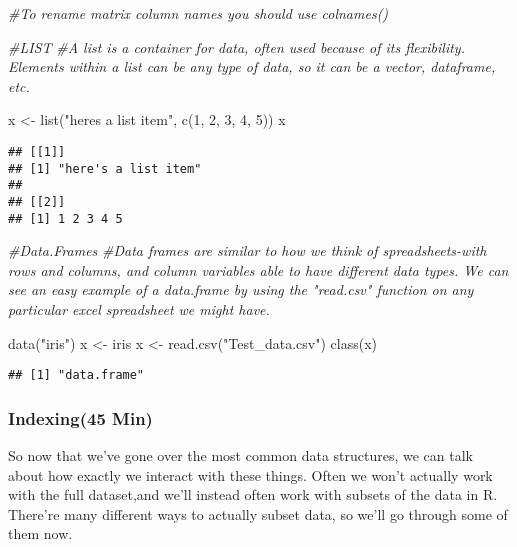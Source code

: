 \documentclass[
]{article}
\newenvironment{Shaded}{\begin{snugshade}}{\end{snugshade}}
\newcommand{\CommentTok}[1]{\textcolor[rgb]{0.56,0.35,0.01}{\textit{#1}}}
\newcommand{\DecValTok}[1]{\textcolor[rgb]{0.00,0.00,0.81}{#1}}
\newcommand{\FunctionTok}[1]{\textcolor[rgb]{0.00,0.00,0.00}{#1}}
\newcommand{\NormalTok}[1]{#1}
\newcommand{\OtherTok}[1]{\textcolor[rgb]{0.56,0.35,0.01}{#1}}
\newcommand{\StringTok}[1]{\textcolor[rgb]{0.31,0.60,0.02}{#1}}
\begin{document}
\begin{Shaded}
\begin{Highlighting}[]
\CommentTok{\#To rename matrix column names you should use colnames()}

\CommentTok{\#LIST}
\CommentTok{\#A list is a container for data, often used because of its flexibility. Elements within a list can be any type of data, so it can be a vector, dataframe, etc.}

\NormalTok{x }\OtherTok{\textless{}{-}} \FunctionTok{list}\NormalTok{(}\StringTok{"here\textquotesingle{}s a list item"}\NormalTok{, }\FunctionTok{c}\NormalTok{(}\DecValTok{1}\NormalTok{, }\DecValTok{2}\NormalTok{, }\DecValTok{3}\NormalTok{, }\DecValTok{4}\NormalTok{, }\DecValTok{5}\NormalTok{))}
\NormalTok{x}
\end{Highlighting}
\end{Shaded}

\begin{verbatim}
## [[1]]
## [1] "here's a list item"
## 
## [[2]]
## [1] 1 2 3 4 5
\end{verbatim}

\begin{Shaded}
\begin{Highlighting}[]
\CommentTok{\#Data.Frames}
\CommentTok{\#Data frames are similar to how we think of spreadsheets{-}with rows and columns, and column variables able to have different data types. We can see an easy example of a data.frame by using the "read.csv" function on any particular excel spreadsheet we might have.}

\FunctionTok{data}\NormalTok{(}\StringTok{"iris"}\NormalTok{)}
\NormalTok{x }\OtherTok{\textless{}{-}}\NormalTok{ iris}
\NormalTok{x }\OtherTok{\textless{}{-}} \FunctionTok{read.csv}\NormalTok{(}\StringTok{"Test\_data.csv"}\NormalTok{)}
\FunctionTok{class}\NormalTok{(x)}
\end{Highlighting}
\end{Shaded}

\begin{verbatim}
## [1] "data.frame"
\end{verbatim}

\hypertarget{indexing45-min}{%
\subsubsection{Indexing(45 Min)}\label{indexing45-min}}

So now that we've gone over the most common data structures, we can talk
about how exactly we interact with these things. Often we won't actually
work with the full dataset,and we'll instead often work with subsets of
the data in R. There're many different ways to actually subset data, so
we'll go through some of them now.
\end{document}
